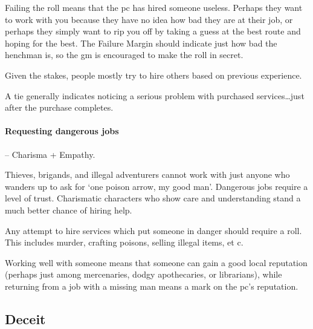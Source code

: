 \begin{multicols}{2}
Failing the roll means that the \gls{pc} has hired someone useless.
Perhaps they want to work with you because they have no idea how bad they are at their job, or perhaps they simply want to rip you off by taking a guess at the best route and hoping for the best.
The Failure Margin should indicate just how bad the henchman is, so the \gls{gm} is encouraged to make the roll in secret.

Given the stakes, people mostly try to hire others based on previous experience.

A tie generally indicates noticing a serious problem with purchased services\ldots just after the purchase completes.

\paragraph{Requesting dangerous jobs} -- Charisma + Empathy.


Thieves, brigands, and illegal adventurers cannot work with just anyone who wanders up to ask for `one poison arrow, my good man'.
Dangerous jobs require a level of trust.
Charismatic characters who show care and understanding stand a much better chance of hiring help.

Any attempt to hire services which put someone in danger should require a roll.
This includes murder, crafting poisons, selling illegal items, et c.

Working well with someone means that someone can gain a good local reputation (perhaps just among mercenaries, dodgy apothecaries, or librarians), while returning from a job with a missing man means a mark on the \gls{pc}'s reputation.

\subsection{Deceit}


\end{multicols}
